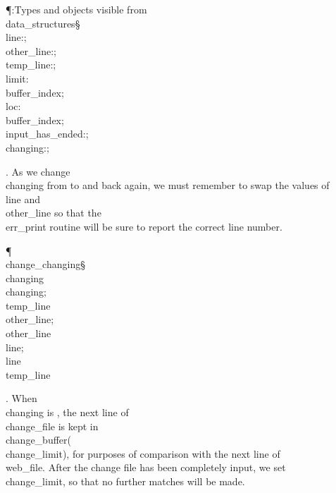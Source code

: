 \Y\P\?\4:Types and objects visible from \\{data\_structures}\X\mathrel{+}\S%
\?\6
\\{line}\?:\?;%
\6
\\{other\_line}\?:\?;\6
\\{temp\_line}\?:\?;\6
\\{limit}\?:\?\\{buffer\_index};\6
\\{loc}\?:\?\\{buffer\_index};\6
\\{input\_has\_ended}\?:\?;\6
\\{changing}\?:\?;\par
\fi

. As we change \\{changing} from  to  and back again, we
must
remember to swap the values of \\{line} and \\{other\_line} so that the
\\{err\_print} routine will be sure to report the correct line number.

\Y\P\4\D\\{change\_changing}\?\S\?\\{changing}\?\K\R\?\\{changing};\5
\\{temp\_line}\?\K\?\\{other\_line};\5
\\{other\_line}\?\K\?\\{line};\5
\\{line}\?\K\?\\{temp\_line}%
\par
\fi

. When \\{changing} is , the next line of \\{change\_file} is
kept in
\\{change\_buffer}\?(\?\to\?\\{change\_limit}\?)\?, for purposes of
comparison with the next
line of \\{web\_file}. After the change file has been completely input, we
set \\{change\_limit}\?\K{}, so that no further matches will be made.


